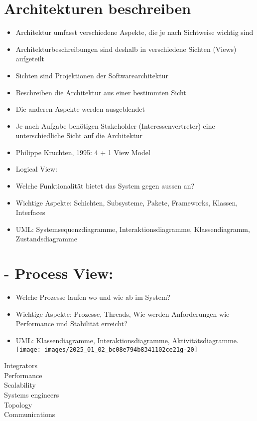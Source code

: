 \documentclass[10pt]{article}
\begin{document}
\section*{Architekturen beschreiben}
\begin{itemize}
  \item Architektur umfasst verschiedene Aspekte, die je nach Sichtweise wichtig sind
  \item Architekturbeschreibungen sind deshalb in verschiedene Sichten (Views) aufgeteilt
  \item Sichten sind Projektionen der Softwarearchitektur
  \item Beschreiben die Architektur aus einer bestimmten Sicht
  \item Die anderen Aspekte werden ausgeblendet
  \item Je nach Aufgabe benötigen Stakeholder (Interessenvertreter) eine unterschiedliche Sicht auf die Architektur
  \item Philippe Kruchten, 1995: 4 + 1 View Model
  \item Logical View:
  \item Welche Funktionalität bietet das System gegen aussen an?
  \item Wichtige Aspekte: Schichten, Subsysteme, Pakete, Frameworks, Klassen, Interfaces
  \item UML: Systemsequenzdiagramme, Interaktionsdiagramme, Klassendiagramm, Zustandsdiagramme
\end{itemize}

\section*{- Process View:}
\begin{itemize}
  \item Welche Prozesse laufen wo und wie ab im System?
  \item Wichtige Aspekte: Prozesse, Threads, Wie werden Anforderungen wie Performance und Stabilität erreicht?
  \item UML: Klassendiagramme, Interaktionsdiagramme, Aktivitätsdiagramme.\\
\texttt{[image: images/2025\_01\_02\_bc08e794b8341102ce21g-20]}
\end{itemize}

Integrators\\
Performance\\
Scalability\\
Systems engineers\\
Topology\\
Communications
\end{document}
